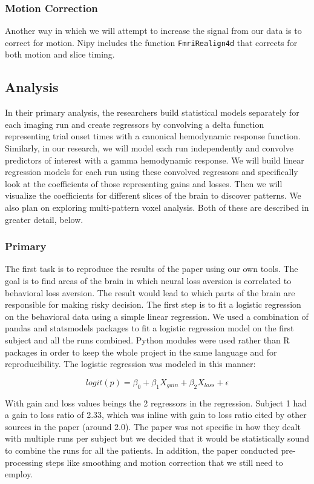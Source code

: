 \documentclass[11pt]{article}
\begin{document}
\subsubsection{Motion Correction}

Another way in which we will attempt to increase the signal from our data is to
correct for motion. Nipy includes the function \texttt{FmriRealign4d} that
corrects for both motion and slice timing.

\subsection{Analysis}

In their primary analysis, the researchers build statistical models separately
for each imaging run and create regressors by convolving a delta function
representing trial onset times with a canonical hemodynamic response function.
Similarly, in our research, we will model each run independently and convolve
predictors of interest with a gamma hemodynamic response. We will build linear
regression models for each run using these convolved regressors and
specifically look at the coefficients of those representing gains and losses.
Then we will visualize the coefficients for different slices of the brain to
discover patterns. We also plan on exploring multi-pattern voxel analysis. Both
of these are described in greater detail, below.

\subsubsection{Primary}

The first task is to reproduce the results of the paper using our own tools.
The goal is to find areas of the brain in which neural loss aversion is
correlated to behavioral loss aversion. The result would lead to which parts of
the brain are responsible for making risky decision. The first step is to fit a
logistic regression on the behavioral data using a simple linear regression. We
used a combination of pandas and statsmodels packages to fit a logistic
regression model on the first subject and all the runs combined. Python modules
were used rather than R packages in order to keep the whole project in the same
language and for reproducibility. The logistic regression was modeled in this
manner:

\[ logit(p) = \beta_0 + \beta_1 X_{gain} + \beta_2 X_{loss} + \epsilon \] 

With gain and loss values beings the 2 regressors in the regression. Subject 1
had a gain to loss ratio of 2.33, which was inline with gain to loss ratio
cited by other sources in the paper (around 2.0). The paper was not specific in
how they dealt with multiple runs per subject but we decided that it would be
statistically sound to combine the runs for all the patients. In addition, the
paper conducted pre-processing steps like smoothing and motion correction that
we still need to employ. 
\end{document}

